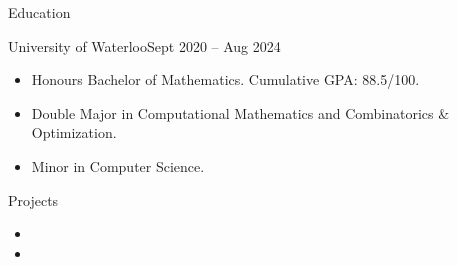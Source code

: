 \documentclass[]{mcdowellcv}
\begin{document}
	\makeheader
	\begin{cvsection}{Education}
		\begin{cvsubsection}{University of Waterloo}{}{Sept 2020 -- Aug 2024}
			\begin{itemize}
				\item Honours Bachelor of Mathematics. Cumulative GPA: 88.5/100.
				\item Double Major in Computational Mathematics and Combinatorics \& Optimization.
				\item Minor in Computer Science.
			\end{itemize}
		\end{cvsubsection}
	\end{cvsection}
	
	
	\begin{cvsection}{Projects}
		\begin{cvsubsection}{}{}{}
			\begin{itemize}
				\item 
				\item 
			\end{itemize}
		\end{cvsubsection}
	\end{cvsection}

	
	
	
	
	
\end{document}
